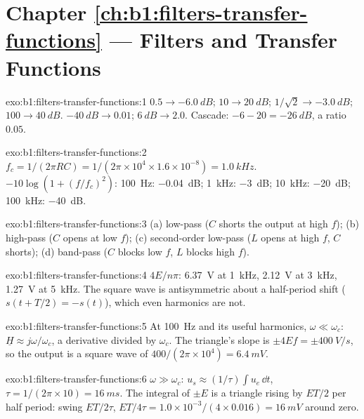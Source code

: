 \section*{Chapter \ref{ch:b1:filters-transfer-functions} --- Filters and Transfer Functions}

\begin{solution}{exo:b1:filters-transfer-functions:1}
$0.5 \to \qty{-6.0}{dB}$; $10 \to \qty{20}{dB}$; $1/\sqrt2 \to \qty{-3.0}{dB}$;
$100 \to \qty{40}{dB}$. $\qty{-40}{dB} \to 0.01$; $\qty{+6}{dB} \to 2.0$.
Cascade: $-6 - 20 = \qty{-26}{dB}$, a ratio $0.05$.
\end{solution}

\begin{solution}{exo:b1:filters-transfer-functions:2}
$f_c = 1/(2\pi RC) = 1/(2\pi \times 10^4 \times 1.6\times10^{-8}) =
\qty{1.0}{kHz}$.  $-10\log(1 + (f/f_c)^2)$: \qty{100}{Hz}:
\qty{-0.04}{dB}; \qty{1}{kHz}: \qty{-3}{dB}; \qty{10}{kHz}: \qty{-20}{dB};
\qty{100}{kHz}: \qty{-40}{dB}.
\end{solution}

\begin{solution}{exo:b1:filters-transfer-functions:3}
(a) low-pass ($C$ shorts the output at high $f$); (b) high-pass ($C$
opens at low $f$); (c) second-order low-pass ($L$ opens at high $f$,
$C$ shorts); (d) band-pass ($C$ blocks low $f$, $L$ blocks high $f$).
\end{solution}

\begin{solution}{exo:b1:filters-transfer-functions:4}
$4E/n\pi$: \qty{6.37}{V} at \qty{1}{kHz}, \qty{2.12}{V} at \qty{3}{kHz},
\qty{1.27}{V} at \qty{5}{kHz}. The square wave is antisymmetric about
a half-period shift ($s(t + T/2) = -s(t)$), which even harmonics are
not.
\end{solution}

\begin{solution}{exo:b1:filters-transfer-functions:5}
At \qty{100}{Hz} and its useful harmonics, $\omega \ll \omega_c$:
$\underline H \approx j\omega/\omega_c$, a derivative divided by
$\omega_c$. The triangle's slope is $\pm 4Ef = \pm\qty{400}{V/s}$, so
the output is a square wave of  $400/(2\pi \times 10^4) =
\qty{6.4}{mV}$.
\end{solution}

\begin{solution}{exo:b1:filters-transfer-functions:6}
$\omega \gg \omega_c$: $u_s \approx (1/\tau)\int u_e\,\dd t$, $\tau =
1/(2\pi \times 10) = \qty{16}{ms}$. The integral of $\pm E$ is a
triangle rising by $ET/2$ per half period: swing $ET/2\tau$, 
$ET/4\tau = 1.0 \times 10^{-3}/(4 \times 0.016) = \qty{16}{mV}$ around
zero.
\end{solution}

